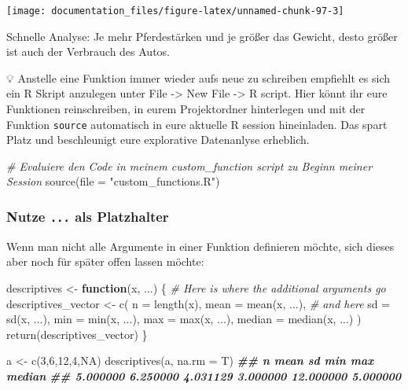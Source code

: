 \documentclass[
]{article}
\newenvironment{Shaded}{\begin{snugshade}}{\end{snugshade}}
\newcommand{\AttributeTok}[1]{\textcolor[rgb]{0.77,0.63,0.00}{#1}}
\newcommand{\CommentTok}[1]{\textcolor[rgb]{0.56,0.35,0.01}{\textit{#1}}}
\newcommand{\ConstantTok}[1]{\textcolor[rgb]{0.00,0.00,0.00}{#1}}
\newcommand{\ControlFlowTok}[1]{\textcolor[rgb]{0.13,0.29,0.53}{\textbf{#1}}}
\newcommand{\DecValTok}[1]{\textcolor[rgb]{0.00,0.00,0.81}{#1}}
\newcommand{\DocumentationTok}[1]{\textcolor[rgb]{0.56,0.35,0.01}{\textbf{\textit{#1}}}}
\newcommand{\FunctionTok}[1]{\textcolor[rgb]{0.00,0.00,0.00}{#1}}
\newcommand{\NormalTok}[1]{#1}
\newcommand{\OtherTok}[1]{\textcolor[rgb]{0.56,0.35,0.01}{#1}}
\newcommand{\StringTok}[1]{\textcolor[rgb]{0.31,0.60,0.02}{#1}}
\begin{document}
\begin{center}\texttt{[image: documentation\_files/figure-latex/unnamed-chunk-97-3]} \end{center}

Schnelle Analyse: Je mehr Pferdestärken und je größer das Gewicht, desto größer ist auch der Verbrauch des Autos.

💡 Anstelle eine Funktion immer wieder aufs neue zu schreiben empfiehlt es sich ein R Skript anzulegen unter File -\textgreater{} New File -\textgreater{} R script. Hier könnt ihr eure Funktionen reinschreiben, in eurem Projektordner hinterlegen und mit der Funktion \texttt{source} automatisch in eure aktuelle R session hineinladen. Das spart Platz und beschleunigt eure explorative Datenanlyse erheblich.

\begin{Shaded}
\begin{Highlighting}[]
\CommentTok{\# Evaluiere den Code in meinem \textasciigrave{}custom\_function\textasciigrave{} script zu Beginn meiner Session}
\FunctionTok{source}\NormalTok{(}\AttributeTok{file =} \StringTok{"custom\_functions.R"}\NormalTok{)}
\end{Highlighting}
\end{Shaded}

\hypertarget{nutze-...-als-platzhalter}{%
\subsubsection{\texorpdfstring{Nutze \texttt{...} als Platzhalter}{Nutze ... als Platzhalter}}\label{nutze-...-als-platzhalter}}

Wenn man nicht alle Argumente in einer Funktion definieren möchte, sich dieses aber noch für später offen lassen möchte:

\begin{Shaded}
\begin{Highlighting}[]
\NormalTok{descriptives }\OtherTok{\textless{}{-}} \ControlFlowTok{function}\NormalTok{(x, ...) \{ }\CommentTok{\# Here is where the additional arguments go}
\NormalTok{  descriptives\_vector }\OtherTok{\textless{}{-}} \FunctionTok{c}\NormalTok{(}
    \AttributeTok{n =} \FunctionTok{length}\NormalTok{(x),}
    \AttributeTok{mean =} \FunctionTok{mean}\NormalTok{(x, ...), }\CommentTok{\# and here}
    \AttributeTok{sd =} \FunctionTok{sd}\NormalTok{(x, ...),     }
    \AttributeTok{min =} \FunctionTok{min}\NormalTok{(x, ...),   }
    \AttributeTok{max =} \FunctionTok{max}\NormalTok{(x, ...),}
    \AttributeTok{median =} \FunctionTok{median}\NormalTok{(x, ...)}
\NormalTok{  )}
  \FunctionTok{return}\NormalTok{(descriptives\_vector)}
\NormalTok{\}}

\NormalTok{a }\OtherTok{\textless{}{-}} \FunctionTok{c}\NormalTok{(}\DecValTok{3}\NormalTok{,}\DecValTok{6}\NormalTok{,}\DecValTok{12}\NormalTok{,}\DecValTok{4}\NormalTok{,}\ConstantTok{NA}\NormalTok{)}
\FunctionTok{descriptives}\NormalTok{(a, }\AttributeTok{na.rm =}\NormalTok{ T)}
\DocumentationTok{\#\#         n      mean        sd       min       max    median }
\DocumentationTok{\#\#  5.000000  6.250000  4.031129  3.000000 12.000000  5.000000}
\end{Highlighting}
\end{Shaded}
\end{document}
